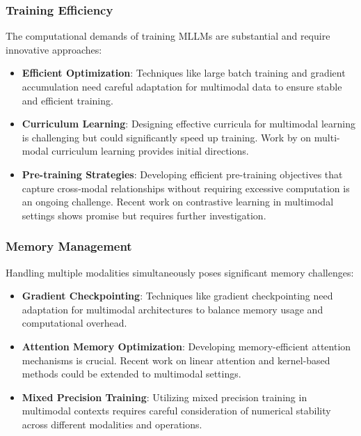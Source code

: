 \subsubsection{Training Efficiency}
The computational demands of training MLLMs are substantial and require innovative approaches:

\begin{itemize}
    \item \textbf{Efficient Optimization}: Techniques like large batch training \citep{you2020large} and gradient accumulation need careful adaptation for multimodal data to ensure stable and efficient training.
    
    \item \textbf{Curriculum Learning}: Designing effective curricula for multimodal learning is challenging but could significantly speed up training. Work by \citet{wang2021multi} on multi-modal curriculum learning provides initial directions.
    
    \item \textbf{Pre-training Strategies}: Developing efficient pre-training objectives that capture cross-modal relationships without requiring excessive computation is an ongoing challenge. Recent work on contrastive learning in multimodal settings \citep{jia2021scaling} shows promise but requires further investigation.
\end{itemize}

\subsubsection{Memory Management}
Handling multiple modalities simultaneously poses significant memory challenges:

\begin{itemize}
    \item \textbf{Gradient Checkpointing}: Techniques like gradient checkpointing \citep{chen2016training} need adaptation for multimodal architectures to balance memory usage and computational overhead.
    
    \item \textbf{Attention Memory Optimization}: Developing memory-efficient attention mechanisms is crucial. Recent work on linear attention \citep{katharopoulos2020transformers} and kernel-based methods \citep{choromanski2021rethinking} could be extended to multimodal settings.
    
    \item \textbf{Mixed Precision Training}: Utilizing mixed precision training \citep{micikevicius2018mixed} in multimodal contexts requires careful consideration of numerical stability across different modalities and operations.
\end{itemize}

